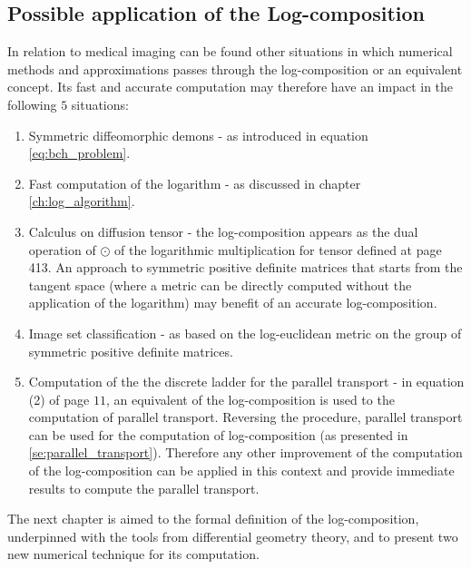 \subsection{Possible application of the Log-composition}
In relation to medical imaging can be found other situations in which numerical methods and approximations passes through the log-composition or an equivalent concept.
Its fast and accurate computation may therefore have an impact in the following $5$ situations:
\begin{enumerate}
	\item Symmetric diffeomorphic demons \cite{vercauteren08} - as introduced in equation \ref{eq:bch_problem}.
	\item Fast computation of the logarithm \cite{Bossa:08} - as discussed in chapter \ref{ch:log_algorithm}.
	\item Calculus on diffusion tensor \cite{Arsigny:MRM:06} - the log-composition appears as the dual operation of $\odot$ of the logarithmic multiplication for tensor defined at page 413. An approach to symmetric positive definite matrices that starts from the tangent space (where a metric can be directly computed without the application of the logarithm) may benefit of an accurate log-composition.  
	\item Image set classification \cite{huanglog} - as based on the log-euclidean metric on the group of symmetric positive definite matrices.
	\item Computation of the the discrete ladder for the parallel transport\cite{Lorenzi:discrete_ladders:14} - in equation (2) of page $11$, an equivalent of the log-composition is used to the computation of parallel transport. Reversing the procedure, parallel transport can be used for the computation of log-composition (as presented in \ref{se:parallel_transport}). Therefore any other improvement of the computation of the log-composition can be applied in this context and provide immediate results to compute the parallel transport.
\end{enumerate}	
	
The next chapter is aimed to the formal definition of the log-composition, underpinned with the tools from differential geometry theory, and to present two new numerical technique for its computation.







